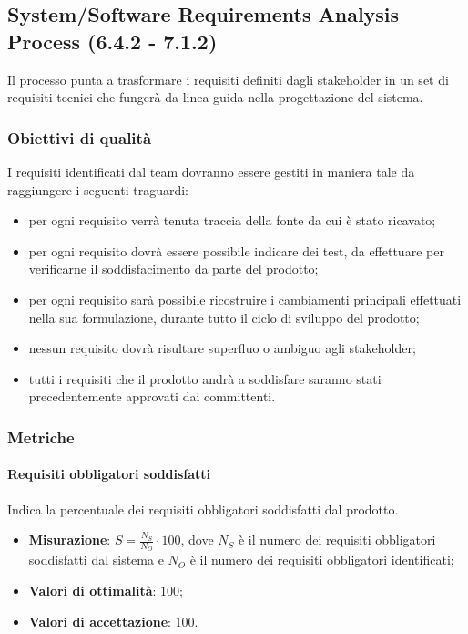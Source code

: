 \subsection{System/Software Requirements Analysis Process (6.4.2 - 7.1.2)}
\label{sySoRequiAna}
Il processo punta a trasformare i requisiti definiti dagli stakeholder in un set di requisiti tecnici che fungerà da linea guida nella progettazione del sistema.
\subsubsection{Obiettivi di qualità}
I requisiti identificati dal team dovranno essere gestiti in maniera tale da raggiungere i seguenti traguardi:
\begin{itemize}
\item per ogni requisito verrà tenuta traccia della fonte da cui è stato ricavato;
\item per ogni requisito dovrà essere possibile indicare dei test, da effettuare per verificarne il soddisfacimento da parte del prodotto;
\item per ogni requisito sarà possibile ricostruire i cambiamenti principali effettuati nella sua formulazione, durante tutto il ciclo di sviluppo del prodotto;
\item nessun requisito dovrà risultare superfluo o ambiguo agli stakeholder;
\item tutti i requisiti che il prodotto andrà a soddisfare saranno stati precedentemente approvati dai committenti.
\end{itemize}
\subsubsection{Metriche}
\paragraph{Requisiti obbligatori soddisfatti}
\label{reqObbSodd}
Indica la percentuale dei requisiti obbligatori soddisfatti dal prodotto.
\begin{itemize}
\item \textbf{Misurazione}: $S=\frac{N_{S}}{N_{O}} \cdot 100$, dove $N_{S}$ è il numero dei requisiti obbligatori soddisfatti dal sistema e $N_{O}$ è il numero dei requisiti obbligatori identificati;
\item \textbf{Valori di ottimalità}: $100$;
\item \textbf{Valori di accettazione}: $100$.
\end{itemize}
